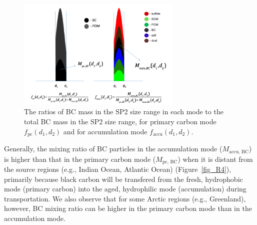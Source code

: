 \documentclass[12pt, fullpage]{uiucthesis2009}
\begin{document}
	\begin{figure}[h] 
		\begin{center}
			\includegraphics[width = 0.7\textwidth]{Rplot07}
			\caption[The ratios of BC mass in the SP2 size range in each mode to the total BC mass in the SP2 size range, for primary carbon mode $f_{\text{pc}}(d_{1}, d_{2})$ and for accumulation mode $f_{\text{accu}}(d_{1}, d_{2})$]{\label{fig_R3} The ratios of BC mass in the SP2 size range in each mode to the total BC mass in the SP2 size range, for primary carbon mode $f_{\text{pc}}(d_{1}, d_{2})$ and for accumulation mode $f_{\text{accu}}(d_{1}, d_{2})$.}
		\end{center}
	\end{figure}
	
	
	Generally, the mixing ratio of BC particles in the accumulation mode ($M_{\text{accu, BC}}$) is higher than that in the primary carbon mode ($M_{\text{pc, BC}}$) when it is distant from the source regions (e.g., Indian Ocean, Atlantic Ocean) (Figure~\ref{fig_R4}), primarily because black carbon will be transfered from the fresh, hydrophobic mode (primary carbon) into the aged, hydrophilic mode (accumulation) during transportation. We also observe that for some Arctic regions (e.g., Greenland), however, BC mixing ratio can be higher in the primary carbon mode than in the accumulation mode.
	
\end{document}

